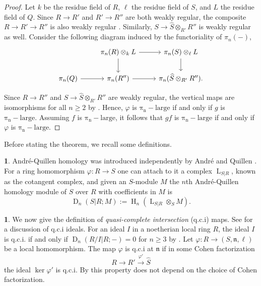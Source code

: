 \documentclass{amsart}
\theoremstyle{definition}
\newtheorem{chunk}[theorem]{}
\newcommand{\D}{\operatorname{D}}
\newcommand{\daq}[4]{\operatorname{D}_{#1}(#2|#3;#4)}
\newcommand{\lco}{\operatorname{L}}
\newcommand{\h}[2][]{\operatorname{H}_{#1}(#2)}
\newcommand{\pil}[1]{\operatorname{\pi_{#1}-large}}
\begin{document}
\begin{proof}
Let $k$ be the residue field of $R$, $\ell$ the residue field of $S$, and $L$ the residue field of $Q$. Since $R \to R'$ and $R' \to R''$ are both weakly regular, the composite $R \to R' \to R''$ is also weakly regular \cite[construction 4.4]{Avramov/Foxby:1998}. Similarly, $S \to \widehat S \otimes_{R'} R''$ is weakly regular as well. Consider the following diagram induced by the functoriality of $\pi_n(-)$,
\[
\begin{tikzcd}
    & \pi_n(R) \otimes_k L \ar[r] \ar[d] & \pi_n(S) \otimes_{\ell} L \ar[d]\\
    \pi_n(Q) \ar[r]  & \pi_n(R'') \ar[r] & \pi_n(\widehat S \otimes_{R'}R'').
\end{tikzcd}
\]

Since $R \to R''$ and $S \to \widehat S \otimes_{R'}R''$ are weakly regular, the vertical maps are isomorphisms for all $n \geq 2$ by . Hence, $\varphi$ is $\pil{n}$ if and only if $g$ is $\pil{n}$. Assuming $f$ is $\pil{n}$, it follows that $gf$ is $\pil{n}$ if and only if $\varphi$ is $\pil{n}$.
\end{proof}


Before stating the theorem, we recall some definitions.
\begin{chunk} André-Quillen homology was introduced independently by André \cite{Andre:1971} and Quillen \cite{Quillen:1970}. For a ring homomorphism $\varphi\colon R\rightarrow S$ one can attach to it a complex $\lco_{S|R}$, known as the cotangent complex, and given an $S$-module $M$ the $n$th André-Quillen homology module of $S$ over $R$ with coefficients in $M$ is
\[\daq{n}{S}{R}{M} := \h[n]{\lco_{S|R}\otimes_{S}M}.\]
\end{chunk}


\begin{chunk}\label{c_qci-def} We now give the definition of \textit{quasi-complete intersection} (q.c.i) maps. See \cite[Section 1]{Avramov/Henriques/Sega:2013} for a discussion of q.c.i ideals. For an ideal $I$ in a noetherian local ring $R$, the ideal $I$ is q.c.i. if and only if $\D_{n}(R/I|R;-)=0$ for $n\geq 3$ by \cite[Corollary 3']{Blanco/Majadas/Rodicio:1998}. Let $\varphi\colon R\rightarrow (S,\mathfrak{n},\ell)$ be a local homomorphism. The map $\varphi$ is q.c.i at $\mathfrak{n}$ if in some Cohen factorization
\[R\rightarrow R'\xrightarrow{\varphi'} \widehat{S}\]
the ideal $\ker{\varphi'}$ is q.c.i. By \cite[Lemma 7.2]{Avramov/Henriques/Sega:2013} this property does not depend on the choice of Cohen factorization. 
\end{chunk}
\end{document}
